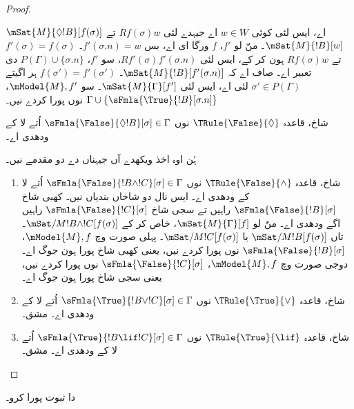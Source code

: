 \documentclass[../../../include/open-logic-section]{subfiles}
\begin{document}
\begin{proof}
\begin{enumerate}
{{$\mSat{M}{\Diamond !B}[f(\sigma)]$ اے، ایس لئی کوئی $w \in W$ اے
  جیہدے لئی $Rf(\sigma)w$ تے $\mSat{M}{!B}[w]$۔ منّ لو $f'$، $f$ ورگا
  ای اے، بس $f'(\sigma.n) = w$۔ $f'(\sigma) = f(\sigma)$ تے
  $Rf(\sigma)w$ ہون کر کے، ایس لئی $Rf'(\sigma)f'(\sigma.n)$، سو $f'$،
  $P(\Gamma) \cup \{\sigma.n\}$ دی تعبیر اے۔ صاف اے کہ
  $\mSat{M}{!B}[f'(\sigma.n)]$۔ $f(\sigma') = f'(\sigma')$
  ہر اگیتے $\sigma' \in P(\Gamma)$ لئی اے، ایس لئی
  $\mSat{M}{\Gamma}[f']$۔ سو $\mModel{M}, f'$،
  $\Gamma \cup \{\sFmla{\True}{!B}[\sigma.n]\}$ نوں پورا کردے نیں۔}
\item شاخ، قاعدہ $\TRule{\False}{\Diamond}$ نوں
  $\sFmla{\False}{\Diamond !B}[\sigma] \in \Gamma$ اُتے لا کے ودھدی اے۔
  }{}
\end{enumerate}
ہُن اوہ اخذ ویکھدے آں جیہناں دے دو مقدمے نیں۔
\begin{enumerate}
\item شاخ، قاعدہ $\TRule{\False}{\land}$ نوں
  $\sFmla{\False}{!B \land !C}[\sigma] \in \Gamma$ اُتے لا کے ودھدی اے۔
  ایس نال دو شاخاں بندیاں نیں۔ کھبی شاخ $\sFmla{\False}{!B}[\sigma]$
  راہیں تے سجی شاخ $\sFmla{\False}{!C}[\sigma]$ راہیں اگے ودھدی اے۔
  منّ لو $\mSat{M}{\Gamma}[f]$، خاص کر کے
  $\mSat/{M}{!B \land !C}[f(\sigma)]$۔ تاں
  $\mSat/{M}{!B}[f(\sigma)]$ یا $\mSat/{M}{!C}[f(\sigma)]$۔
  پہلی صورت وچ $\mModel{M}, f$، $\sFmla{\False}{!B}[\sigma]$ نوں
  پورا کردے نیں، یعنی کھبی شاخ پورا ہون جوگ اے۔ دوجی صورت وچ
  $\mModel{M}, f$، $\sFmla{\False}{!C}[\sigma]$ نوں پورا کردے نیں،
  یعنی سجی شاخ پورا ہون جوگ اے۔
\item شاخ، قاعدہ $\TRule{\True}{\lor}$ نوں
    $\sFmla{\True}{!B \lor !C}[\sigma] \in \Gamma$ اُتے لا کے ودھدی اے۔ مشق۔
\item شاخ، قاعدہ $\TRule{\True}{\lif}$ نوں
    $\sFmla{\True}{!B \lif !C}[\sigma] \in \Gamma$ اُتے لا کے ودھدی اے۔ مشق۔
\end{enumerate}
\end{proof}

\begin{prob}
 دا ثبوت پورا کرو۔
\end{prob}
\end{document}
